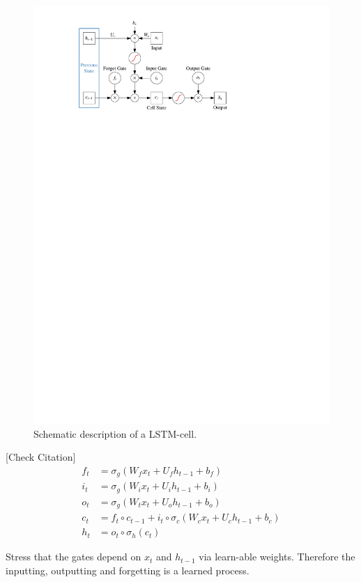 \begin{figure}[t]
  \centering
  \includegraphics{./figures/theory/LSTM.pdf}
  \caption{Schematic description of a LSTM-cell.}
  \label{fig:schematic_lstm}
\end{figure}

[Check Citation]\cite{lstm}
\begin{align*}
  f_t &= \sigma_g( W_f x_t + U_f h_{t-1} + b_f) \\
  i_t &= \sigma_g( W_i x_t + U_i h_{t-1} + b_i) \\
  o_t &= \sigma_g( W_t x_t + U_o h_{t-1} + b_o) \\
  c_t &= f_t \circ c_{t-1} + i_t \circ \sigma_c(W_c x_t + U_c h_{t-1} + b_c) \\
  h_t &= o_t \circ \sigma_h(c_t)
\end{align*}

Stress that the gates depend on $x_t$ and $h_{t-1}$ via learn-able weights.
Therefore the inputting, outputting and forgetting is a learned process.

